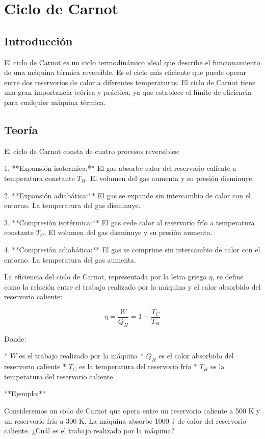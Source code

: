 \documentclass[../main]{subfiles}
\begin{document}
\chapter{Ciclo de Carnot}

\section{Introducción}

El ciclo de Carnot es un ciclo termodinámico ideal que describe el funcionamiento de una máquina térmica reversible. Es el ciclo más eficiente que puede operar entre dos reservorios de calor a diferentes temperaturas. El ciclo de Carnot tiene una gran importancia teórica y práctica, ya que establece el límite de eficiencia para cualquier máquina térmica.

\section{Teoría}

El ciclo de Carnot consta de cuatro procesos reversibles:

1. **Expansión isotérmica:** El gas absorbe calor del reservorio caliente a temperatura constante $T_H$. El volumen del gas aumenta y su presión disminuye.

2. **Expansión adiabática:** El gas se expande sin intercambio de calor con el entorno. La temperatura del gas disminuye.

3. **Compresión isotérmica:** El gas cede calor al reservorio frío a temperatura constante $T_C$. El volumen del gas disminuye y su presión aumenta.

4. **Compresión adiabática:** El gas se comprime sin intercambio de calor con el entorno. La temperatura del gas aumenta.

La eficiencia del ciclo de Carnot, representada por la letra griega $\eta$, se define como la relación entre el trabajo realizado por la máquina y el calor absorbido del reservorio caliente:

$$\eta = \frac{W}{Q_H} = 1 - \frac{T_C}{T_H}$$

Donde:

* $W$ es el trabajo realizado por la máquina
* $Q_H$ es el calor absorbido del reservorio caliente
* $T_C$ es la temperatura del reservorio frío
* $T_H$ es la temperatura del reservorio caliente

**Ejemplo:**

Consideremos un ciclo de Carnot que opera entre un reservorio caliente a 500 K y un reservorio frío a 300 K. La máquina absorbe 1000 J de calor del reservorio caliente. ¿Cuál es el trabajo realizado por la máquina?
\end{document}
